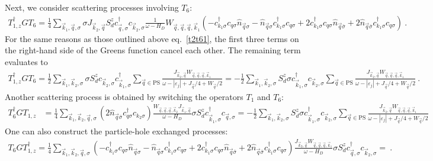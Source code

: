 \documentclass{revtex4-2}
\begin{document}
Next, we consider scattering processes involving \(T_6\):
\begin{equation}\begin{aligned}
	T_{1,z}^\dagger G T_6 = \frac{1}{4}\sum_{\vec k_1,\vec q,\sigma}\sigma J_{\vec k_2,\vec q}S_d^z c^\dagger_{\vec q,\sigma} c_{\vec k_2,\sigma} \frac{1}{\omega - H_D} W_{\vec q,\vec q,\vec q,\vec k_1} \left(-c^\dagger_{k_1\sigma}c_{q\sigma}\hat n_{\vec q\sigma} - \hat n_{\vec q\sigma} c^\dagger_{k_1\sigma}c_{q\sigma} + 2 c^\dagger_{k_1\sigma}c_{q\sigma}\hat n_{\vec q\bar\sigma} + 2\hat n_{\vec q\bar\sigma} c^\dagger_{k_1\sigma}c_{q\sigma}\right)~.
\end{aligned}\end{equation}
For the same reasons as those outlined above eq.~\ref{t2t61}, the first three terms on the right-hand side of the Greens function cancel each other. The remaining term evaluates to
\begin{equation}\begin{aligned}
	T_{1,z}^\dagger G T_6 = \frac{1}{2}\sum_{\vec k_1,\vec k_2,\sigma}\sigma S_d^z c_{\vec k_2,\sigma}c^\dagger_{\vec k_1,\sigma} \sum_{\vec q\in\text{PS}}\frac{J_{\vec k_2,\vec q} W_{\vec q,\vec q,\vec q,\vec k_1}}{\omega - |\varepsilon_j| + J_{\vec q}/4 + W_{\vec q}/2} = -\frac{1}{2}\sum_{\vec k_1,\vec k_2,\sigma} S_d^z \sigma c^\dagger_{\vec k_1,\sigma} c_{\vec k_2,\sigma} \sum_{\vec q\in\text{PS}}\frac{J_{\vec k_2,\vec q} W_{\vec q,\vec q,\vec q,\vec k_1}}{\omega - |\varepsilon_j| + J_{\vec q}/4 + W_{\vec q}/2}~.
\end{aligned}\end{equation}
Another scattering process is obtained by switching the operators \(T_1\) and \(T_6\):
\begin{equation}\begin{aligned}
	T_{6}^\dagger G T_{1,z} &= \frac{1}{4} \sum_{\vec k_1,\vec k_2,\vec q,\sigma} \left(2\hat n_{\vec q\bar\sigma} c^\dagger_{q\sigma}c_{k_2\sigma}\right) \frac{W_{\vec q,\vec q,\vec q,\vec k_2} J_{\vec k_1,\vec q}}{\omega - H_D} \sigma S_d^z c^\dagger_{\vec k_1,\sigma} c_{\vec q,\sigma} = -\frac{1}{2}\sum_{\vec k_1,\vec k_2,\sigma} S_d^z \sigma c^\dagger_{\vec k_1,\sigma} c_{\vec k_2,\sigma} \sum_{\vec q\in\text{PS}}\frac{J_{\vec k_2,\vec q} W_{\vec q,\vec q,\vec q,\vec k_1}}{\omega - |\varepsilon_j| + J_{\vec q}/4 + W_{\vec q}/2}
\end{aligned}\end{equation}
One can also construct the particle-hole exchanged processes:
\begin{equation}\begin{aligned}
	T_6 G T_{1,z}^\dagger = \frac{1}{4}\sum_{\vec k_1, \vec k_2, \vec q, \sigma}\left(-c^\dagger_{k_1\sigma}c_{q\sigma}\hat n_{\vec q\sigma} - \hat n_{\vec q\sigma} c^\dagger_{k_1\sigma}c_{q\sigma} + 2 c^\dagger_{k_1\sigma}c_{q\sigma}\hat n_{\vec q\bar\sigma} + 2\hat n_{\vec q\bar\sigma} c^\dagger_{k_1\sigma}c_{q\sigma}\right) \frac{J_{\vec k_2,\vec q} W_{\vec q,\vec q,\vec q,\vec k_1}}{\omega - H_D} \sigma S_d^z c^\dagger_{\vec q,\sigma} c_{\vec k_2,\sigma} = ~.
\end{aligned}\end{equation}
\end{document}
